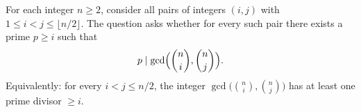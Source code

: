 For each integer $n\ge 2$, consider all pairs of integers $(i,j)$ with $1\le i<j\le \lfloor n/2\rfloor$.
The question asks whether for every such pair there exists a prime $p\ge i$ such that
\[p\mid \gcd\Bigl(\binom{n}{i},\binom{n}{j}\Bigr).
\]
Equivalently: for every $i<j\le n/2$, the integer $\gcd\bigl(\binom{n}{i},\binom{n}{j}\bigr)$ has at least one prime divisor $\ge i$.
